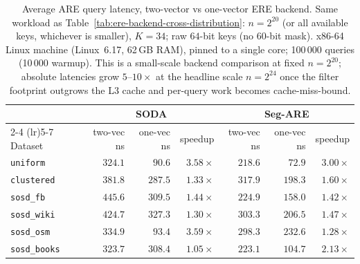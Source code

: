 \begin{table}[H]
    \centering
    \setlength{\tabcolsep}{5pt}
    \small
    \begin{tabular}{@{}lrrrrrr@{}}
        \toprule
        & \multicolumn{3}{c}{SODA} & \multicolumn{3}{c}{Seg-ARE} \\
        \cmidrule(lr){2-4} \cmidrule(lr){5-7}
        Dataset
        & two-vec ns & one-vec ns & speedup
        & two-vec ns & one-vec ns & speedup \\
        \midrule
        \texttt{uniform}     & $324.1$ & $90.6$  & $3.58\times$ & $218.6$ & $72.9$  & $3.00\times$ \\
        \texttt{clustered}   & $381.8$ & $287.5$ & $1.33\times$ & $317.9$ & $198.3$ & $1.60\times$ \\
        \texttt{sosd\_fb}    & $445.6$ & $309.5$ & $1.44\times$ & $224.9$ & $158.0$ & $1.42\times$ \\
        \texttt{sosd\_wiki}  & $424.7$ & $327.3$ & $1.30\times$ & $303.3$ & $206.5$ & $1.47\times$ \\
        \texttt{sosd\_osm}   & $334.9$ & $93.4$  & $3.59\times$ & $298.3$ & $232.6$ & $1.28\times$ \\
        \texttt{sosd\_books} & $323.7$ & $308.4$ & $1.05\times$ & $223.1$ & $104.7$ & $2.13\times$ \\
        \bottomrule
    \end{tabular}
    \caption{Average ARE query latency, two-vector vs one-vector ERE backend.
    Same workload as Table~\ref{tab:ere-backend-cross-distribution}:
        $n = 2^{20}$ (or all available keys, whichever is smaller), $K = 34$;
        raw $64$-bit keys (no $60$-bit mask). x86-64 Linux machine
        (Linux~6.17, 62\,GB RAM), pinned to a single core;
        100\,000 queries (10\,000 warmup).
        This is a small-scale backend
        comparison at fixed $n = 2^{20}$; absolute latencies grow $5$--$10\times$
        at the headline scale $n = 2^{24}$ once the filter footprint outgrows
        the L3 cache and per-query work becomes cache-miss-bound.}
    \label{tab:ere-backend-query-latency}
\end{table}